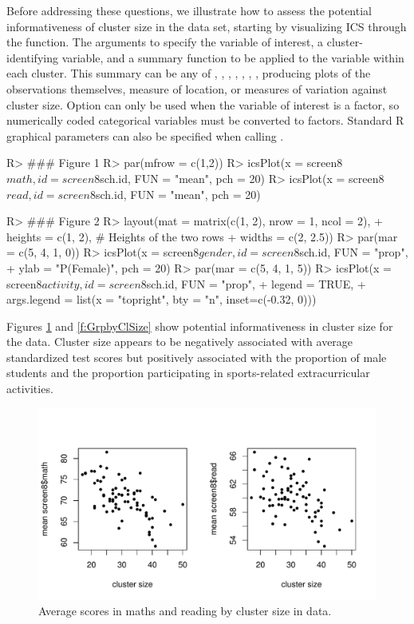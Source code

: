 Before addressing these questions, we illustrate how to assess the potential informativeness of cluster size in the data set, starting by visualizing ICS through the  function. The arguments to  specify the variable of interest, a cluster-identifying variable, and a summary function to be applied to the variable within each cluster. This summary can be any of , , , , , , , producing plots of the observations themselves, measure of location, or measures of variation against cluster size. Option  can only be used when the variable of interest is a factor, so numerically coded categorical variables must be converted to factors. Standard R graphical parameters can also be specified when calling .
\begin{example}	
	R> ### Figure 1
	R> par(mfrow = c(1,2))
	R> icsPlot(x = screen8$math, id = screen8$sch.id, FUN = "mean", pch = 20)
	R> icsPlot(x = screen8$read, id = screen8$sch.id, FUN = "mean", pch = 20)
	
	R> ### Figure 2
	R> layout(mat = matrix(c(1, 2), nrow = 1, ncol = 2),
	+        heights = c(1, 2), # Heights of the two rows
	+        widths = c(2, 2.5))
	R> par(mar = c(5, 4, 1, 0))
	R> icsPlot(x = screen8$gender, id = screen8$sch.id, FUN = "prop", 
	+        ylab = "P(Female)", pch = 20)
	R> par(mar = c(5, 4, 1, 5))
	R> icsPlot(x = screen8$activity, id = screen8$sch.id, FUN = "prop", 
	+         legend = TRUE,
	+         args.legend = list(x = "topright", bty = "n", inset=c(-0.32, 0)))
\end{example}
Figures \ref{f:ScorebyClSize} and \ref{f:GrpbyClSize} show potential informativeness in cluster size for the  data. Cluster size appears to be negatively associated with average standardized test scores but positively associated with the proportion of male students and the proportion participating in sports-related extracurricular activities.
\label{s:screen8}
\begin{figure}[t!]
	\setlength{\fboxsep}{0pt}%
	\setlength{\fboxrule}{0pt}%
	\begin{center}
		\includegraphics[scale=.6] {MathRead.pdf}
		\caption{Average scores in maths and reading by cluster size in  data.}
		\label{f:ScorebyClSize}
	\end{center}
\end{figure}
